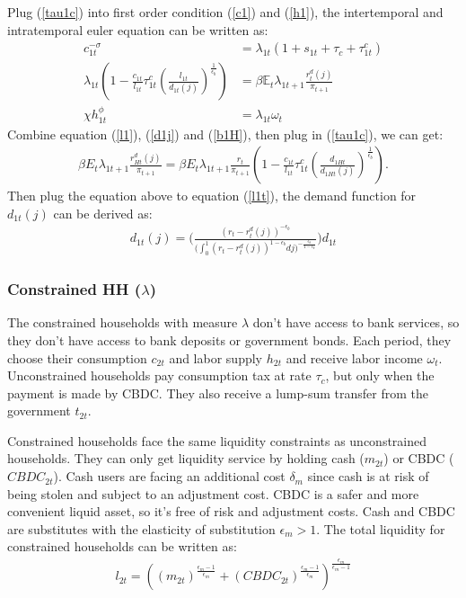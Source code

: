 \documentclass[12pt]{article}
\newcommand{\E}{\mathbb{E}}
\begin{document}
Plug (\ref{tau1c}) into first order condition (\ref{c1}) and (\ref{h1}), the intertemporal and intratemporal euler equation can be written as: 
\begin{align*}
c_{1t}^{-\sigma} &= \lambda_{1t}(1+s_{1t}+\tau_c+\tau_{1t}^c) \\
\lambda_{1t}(1-\frac{c_{1t}}{l_{1t}}\tau_{1t}^c(\frac{l_{1t}}{d_{1t}(j)})^{\frac{1}{\epsilon_b}}) &= \beta \E_t\lambda_{1t+1}\frac{r_{t}^d(j)}{\pi_{t+1}} \\
\chi h_{1t}^{\phi} &= \lambda_{1t}\omega_t 
\end{align*}
Combine equation (\ref{l1}), (\ref{d1j}) and (\ref{b1H}), then plug in (\ref{tau1c}), we can get: 
\begin{align*}
\beta E_t\lambda_{1t+1}\frac{r_{Ht}^d(j)}{\pi_{t+1}} = \beta E_t\lambda_{1t+1}\frac{r_t}{\pi_{t+1}}(1-\frac{c_{1t}}{l_{1t}}\tau_{1t}^c(\frac{d_{1Ht}}{d_{1Ht}(j)})^{\frac{1}{\epsilon_b}}). 
\end{align*}
Then plug the equation above to equation (\ref{l1t}), the demand function for $d_{1t}(j)$ can be derived as:
\begin{align}
d_{1t}(j) = \Biggl(\frac{(r_t-r_t^d(j))^{-\epsilon_b}}{\big(\int_0^1(r_t-r_t^d(j))^{1-\epsilon_b}dj\big)^{-\frac{\epsilon_b}{1-\epsilon_b}}}\Biggl)d_{1t}
\end{align}

\subsubsection*{Constrained HH ($\lambda$)}
The constrained households with measure $\lambda$ don't have access to bank services, so they don't have access to bank deposits or government bonds. Each period, they choose their consumption $c_{2t}$ and labor supply $h_{2t}$ and receive labor income $\omega_t$. Unconstrained households pay consumption tax at rate $\tau_c$, but only when the payment is made by CBDC. They also receive a lump-sum transfer from the government $t_{2t}$. 

Constrained households face the same liquidity constraints as unconstrained households. They can only get liquidity service by holding cash ($m_{2t}$) or CBDC ($CBDC_{2t}$). Cash users are facing an additional cost $\delta_m$ since cash is at risk of being stolen and subject to an adjustment cost. CBDC is a safer and more convenient liquid asset, so it's free of risk and adjustment costs. Cash and CBDC are substitutes with the elasticity of substitution $\epsilon_m>1$. The total liquidity for constrained households can be written as: 
\begin{align*}
l_{2t} = ((m_{2t})^{\frac{\epsilon_m-1}{\epsilon_m}}+(CBDC_{2t})^{\frac{\epsilon_m-1}{\epsilon_m}})^{\frac{\epsilon_m}{\epsilon_m-1}}
\end{align*}
\end{document}
